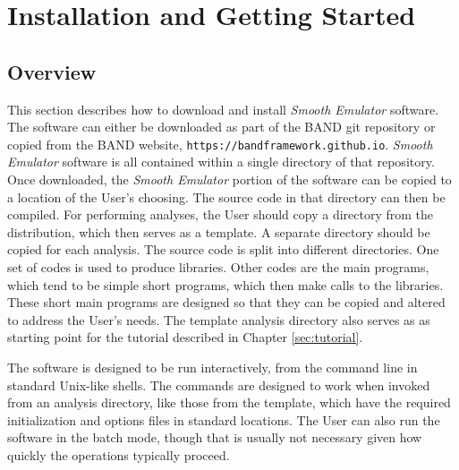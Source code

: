 \documentclass[UserManual.tex]{subfiles}
\begin{document}
\begin{sloppypar}

\section{Installation and Getting Started}\label{sec:installation}

\subsection{Overview}
This section describes how to download and install {\it Smooth Emulator} software. The software can either be downloaded as part of the BAND git repository or copied from the BAND website, {\tt https://bandframework.github.io}. {\it Smooth Emulator} software is all contained within a single directory of that repository. Once downloaded, the {\it Smooth Emulator} portion of the software can be copied to a location of the User's choosing. The source code in that directory can then be compiled. For performing analyses, the User should copy a directory from the distribution, which then serves as a template. A separate directory should be copied for each analysis. The source code is split into different directories. One set of codes is used to produce libraries. Other codes are the main programs, which tend to be simple short programs, which then make calls to the libraries. These short main programs are designed so that they can be copied and altered to address the User's needs. The template analysis directory also serves as as starting point for the tutorial described in Chapter \ref{sec:tutorial}.

The software is designed to be run interactively, from the command line in standard Unix-like shells. The commands are designed to work when invoked from an analysis directory, like those from the template, which have the required initialization and options files in standard locations. The User can also run the software in the batch mode, though that is usually not necessary given how quickly the operations typically proceed.


\end{sloppypar}
\end{document}
